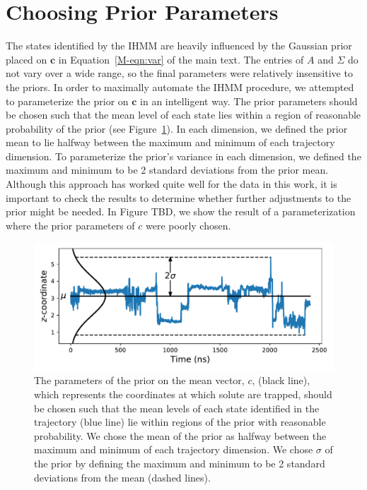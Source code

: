\documentclass{article}
\begin{document}
  \newpage
  
  \section{Choosing Prior Parameters}\label{section:prior_guesses}  
  
  The states identified by the IHMM are heavily influenced by the Gaussian prior
  placed on $\mathbf{c}$ in Equation~\ref{M-eqn:var} of the main text. The 
  entries of $A$ and $\Sigma$ do not vary over a wide range, so the final
  parameters were relatively insensitive to the priors. In order to 
  maximally automate the IHMM procedure, we attempted to parameterize the
  prior on $\mathbf{c}$ in an intelligent way. The prior parameters should
  be chosen such that the mean level of each state lies within a region of 
  reasonable probability of the prior (see Figure~\ref{fig:prior_guesses}).
  In each dimension, we defined the prior mean to lie halfway between the 
  maximum and minimum of each trajectory dimension. To parameterize the 
  prior's variance in each dimension, we defined the maximum and minimum to 
  be 2 standard deviations from the prior mean. Although this approach has 
  worked quite well for the data in this work, it is important to check the 
  results to determine whether further adjustments to the prior might be needed.
  In Figure TBD, we show the result of a parameterization where the prior
  parameters of $c$ were poorly chosen. %
  
  \begin{figure}[h]
  \centering
  \includegraphics[width=\textwidth]{prior_guesses.pdf}
  \caption{The parameters of the prior on the mean vector, $c$, (black line), which
  represents the coordinates at which solute are trapped, should be chosen such
  that the mean levels of each state identified in the trajectory (blue line) lie within
  regions of the prior with reasonable probability. We chose the mean of the prior 
  as halfway between the maximum and minimum of each trajectory dimension. We chose 
  $\sigma$ of the prior by defining the maximum and minimum to be 2 standard deviations
  from the mean (dashed lines).}\label{fig:prior_guesses}
  \end{figure}
  
\end{document}
